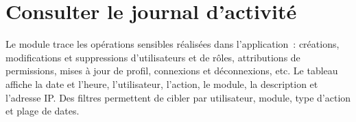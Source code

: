 \section{Consulter le journal d'activité}

Le module  trace les opérations sensibles réalisées dans l'application~: créations, modifications et suppressions d'utilisateurs et de rôles, attributions de permissions, mises à jour de profil, connexions et déconnexions, etc. Le tableau affiche la date et l'heure, l'utilisateur, l'action, le module, la description et l'adresse IP. Des filtres permettent de cibler par utilisateur, module, type d'action et plage de dates.


